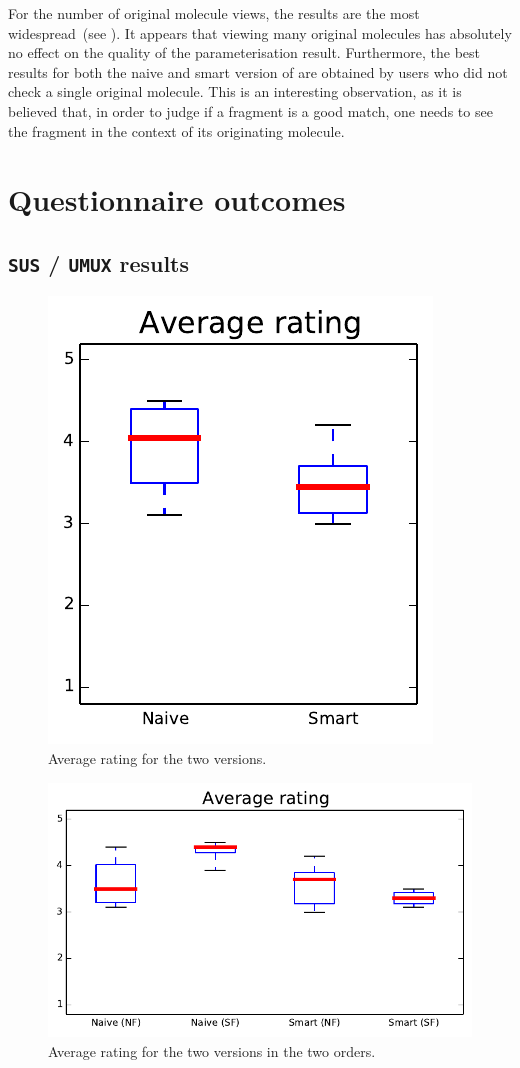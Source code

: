 For the number of original molecule views, the results are the most widespread~(see ). It appears that viewing many original molecules has absolutely no effect on the quality of the parameterisation result. Furthermore, the best results for both the naive and smart version of \oframp{} are obtained by users who did not check a single original molecule. This is an interesting observation, as it is believed that, in order to judge if a fragment is a good match, one needs to see the fragment in the context of its originating molecule.


\section{Questionnaire outcomes}
\nlipsum

\subsection{\texttt{SUS} / \texttt{UMUX} results}
\nlipsum

\begin{figure}[h!]
\center
\includegraphics[width=.3\textwidth]{img/graphs/4a_10.pdf}
\caption{Average rating for the two versions.}
\end{figure}

\begin{figure}[h!]
\center
\includegraphics[width=.6\textwidth]{img/graphs/4b_10.pdf}
\caption{Average rating for the two versions in the two orders.}
\end{figure}

